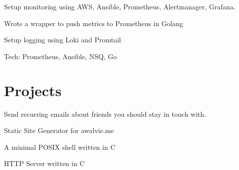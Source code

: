 \documentclass[]{config}
\begin{document}
\begin{minipage}[t]{0.66\textwidth}
\begin{tightemize}
\item Setup monitoring using AWS, Ansible, Prometheus, Alertmanager, Grafana.
\item Wrote a wrapper to push metrics to Prometheus in Golang
\item Setup logging using Loki and Promtail
\item Tech: Prometheus, Ansible, NSQ, Go
\end{tightemize}
\sectionsep


\section{Projects}

\begin{tightemize}
\item  Send recurring emails about friends you should stay in touch with.
\end{tightemize}
\sectionsep

\begin{tightemize}
\item Static Site Generator for awalvie.me
\end{tightemize}
\sectionsep

\begin{tightemize}
\item A minimal POSIX shell written in C
\end{tightemize}
\sectionsep

\begin{tightemize}
\item HTTP Server written in C
\end{tightemize}
\sectionsep

\end{minipage}
\end{document}
